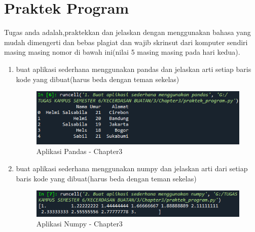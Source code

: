 \section{Praktek Program}
Tugas anda adalah,praktekkan dan jelaskan dengan menggunakan bahasa yang mudah dimengerti dan bebas plagiat dan wajib skrinsut dari komputer sendiri masing masing nomor di bawah ini(nilai 5 masing masing pada hari kedua).

\begin{enumerate}
    \item buat aplikasi sederhana menggunakan pandas dan jelaskan arti setiap baris kode yang dibuat(harus beda dengan teman sekelas)
          \begin{figure}[ht]
              \centerline{\includegraphics[scale=0.7]{figures/chapter3-1.png}}
              \caption{Aplikasi Pandas - Chapter3}
              \label{Aplikasi Pandas - Chapter3}
          \end{figure}

    \item buat aplikasi sederhana menggunakan numpy dan jelaskan arti dari setiap baris kode yang dibuat(harus beda dengan teman sekelas)
          \begin{figure}[ht]
              \centerline{\includegraphics[scale=0.7]{figures/chapter3-2.png}}
              \caption{Aplikasi Numpy - Chapter3}
              \label{Aplikasi Numpy - Chapter3}
          \end{figure}


\end{enumerate}
